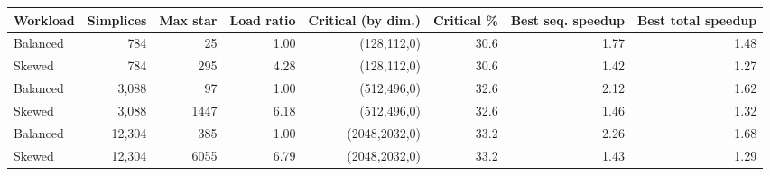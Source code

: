 \begin{tabular}{lrrrrrrr}
\toprule
Workload & Simplices & Max star & Load ratio & Critical (by dim.) & Critical \% & Best seq. speedup & Best total speedup \\
\midrule
Balanced & 784 & 25 & 1.00 & (128,112,0) & 30.6 & 1.77 & 1.48 \\
Skewed & 784 & 295 & 4.28 & (128,112,0) & 30.6 & 1.42 & 1.27 \\
Balanced & 3,088 & 97 & 1.00 & (512,496,0) & 32.6 & 2.12 & 1.62 \\
Skewed & 3,088 & 1447 & 6.18 & (512,496,0) & 32.6 & 1.46 & 1.32 \\
Balanced & 12,304 & 385 & 1.00 & (2048,2032,0) & 33.2 & 2.26 & 1.68 \\
Skewed & 12,304 & 6055 & 6.79 & (2048,2032,0) & 33.2 & 1.43 & 1.29 \\
\bottomrule
\end{tabular}
